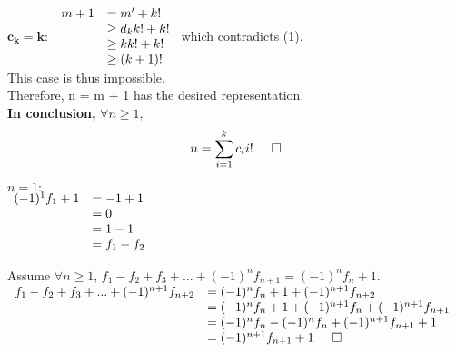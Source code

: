 \documentclass[a4paper, 11pt]{article}
\begin{document}
\begin{myEnumerate}
\begin{myEnumerate}
        $\mathbf{c_k = k}:$ \( \\
        \begin{array}{ll}
        	m + 1 & = m' + k! \\
            	  & \geq d_k k! + k! \\
                  & \geq kk! + k! \\
                  & \geq (k + 1)!
        \end{array} \\ \)
        which contradicts (1). \\
        This case is thus impossible. \\
        
        Therefore, n = m + 1 has the desired representation. \\
        
        \textbf{In conclusion,} $\forall n \geq 1,$
        $$ n = \sum_{i=1}^k c_i i! \hspace{0.5cm} \square $$
    \end{myEnumerate}
	
    \item
    \begin{myEnumerate}
    	\item
        $ n = 1: $ \\ \(
        \begin{array}{ll}
        	(-1)^1 f_1 + 1 & = -1 + 1 \\
            			   & = 0 \\
                           & = 1 - 1 \\
                           & = f_1 - f_2
        \end{array} \\ \)
        
        Assume $\forall n \geq 1$, $f_1 - f_2 + f_3 +...+ (-1)^n f_{n+1} = (-1)^n f_n + 1$. \\
        
        \(
        \begin{array}{ll}
        	f_1 - f_2 + f_3 +...+ (-1)^{n+1}f_{n+2} & = (-1)^n f_n + 1 + (-1)^{n+1}f_{n+2} \\
            										& = (-1)^n f_n + 1 + (-1)^{n+1}f_n + (-1)^{n+1}f_{n+1} \\
                                                    & = (-1)^n f_n - (-1)^n f_n + (-1)^{n+1}f_{n+1} + 1 \\
                                                    & = (-1)^{n+1}f_{n+1} + 1 \hspace{0.5cm} \square
        \end{array} \)
        

\end{myEnumerate}
\end{myEnumerate}
\end{document}
